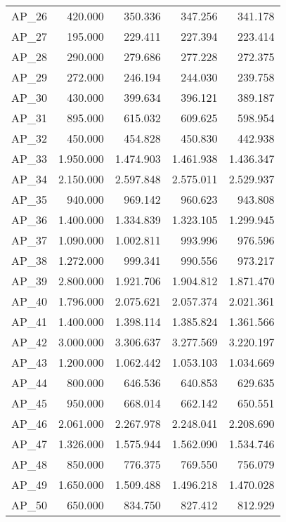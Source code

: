 \documentclass[a4paper]{article}
\begin{document}
\begin{table}
\begin{tabular}[t]{lrrrr}
\addlinespace
AP\_26 & 420.000 & 350.336 & 347.256 & 341.178\\
AP\_27 & 195.000 & 229.411 & 227.394 & 223.414\\
AP\_28 & 290.000 & 279.686 & 277.228 & 272.375\\
AP\_29 & 272.000 & 246.194 & 244.030 & 239.758\\
AP\_30 & 430.000 & 399.634 & 396.121 & 389.187\\
\addlinespace
AP\_31 & 895.000 & 615.032 & 609.625 & 598.954\\
AP\_32 & 450.000 & 454.828 & 450.830 & 442.938\\
AP\_33 & 1.950.000 & 1.474.903 & 1.461.938 & 1.436.347\\
AP\_34 & 2.150.000 & 2.597.848 & 2.575.011 & 2.529.937\\
AP\_35 & 940.000 & 969.142 & 960.623 & 943.808\\
\addlinespace
AP\_36 & 1.400.000 & 1.334.839 & 1.323.105 & 1.299.945\\
AP\_37 & 1.090.000 & 1.002.811 & 993.996 & 976.596\\
AP\_38 & 1.272.000 & 999.341 & 990.556 & 973.217\\
AP\_39 & 2.800.000 & 1.921.706 & 1.904.812 & 1.871.470\\
AP\_40 & 1.796.000 & 2.075.621 & 2.057.374 & 2.021.361\\
\addlinespace
AP\_41 & 1.400.000 & 1.398.114 & 1.385.824 & 1.361.566\\
AP\_42 & 3.000.000 & 3.306.637 & 3.277.569 & 3.220.197\\
AP\_43 & 1.200.000 & 1.062.442 & 1.053.103 & 1.034.669\\
AP\_44 & 800.000 & 646.536 & 640.853 & 629.635\\
AP\_45 & 950.000 & 668.014 & 662.142 & 650.551\\
\addlinespace
AP\_46 & 2.061.000 & 2.267.978 & 2.248.041 & 2.208.690\\
AP\_47 & 1.326.000 & 1.575.944 & 1.562.090 & 1.534.746\\
AP\_48 & 850.000 & 776.375 & 769.550 & 756.079\\
AP\_49 & 1.650.000 & 1.509.488 & 1.496.218 & 1.470.028\\
AP\_50 & 650.000 & 834.750 & 827.412 & 812.929\\
\bottomrule
\end{tabular}
\end{table}

\end{document}
